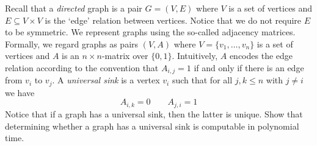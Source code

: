 \begin{ex}
	Recall that a \emph{directed} graph is a pair $G = (V,E)$ where $V$ is a set of vertices and $E \subseteq V \times V$ is the `edge' relation between vertices. Notice that we do not require $E$ to be symmetric. We represent graphs using the so-called adjacency matrices. Formally, we regard graphs as pairs $(V,A)$ where $V = \{v_1,\ldots,v_n\}$ is a set of vertices and $A$ is an $n \times n$-matrix over $\{0,1\}$. Intuitively, $A$ encodes the edge relation according to the convention that $A_{i,j} = 1$ if and only if there is an edge from $v_i$ to $v_j$. A \emph{universal sink} is a vertex $v_i$ such that for all $j,k \leq n$ with $j \neq i$ we have
	\[
		A_{i,k} = 0 \qquad A_{j,i} = 1
	\]
	Notice that if a graph has a universal sink, then the latter is unique.
	Show that determining whether a graph has a universal sink is computable in polynomial time.
	\label{ex:universal-sink}
\end{ex}
